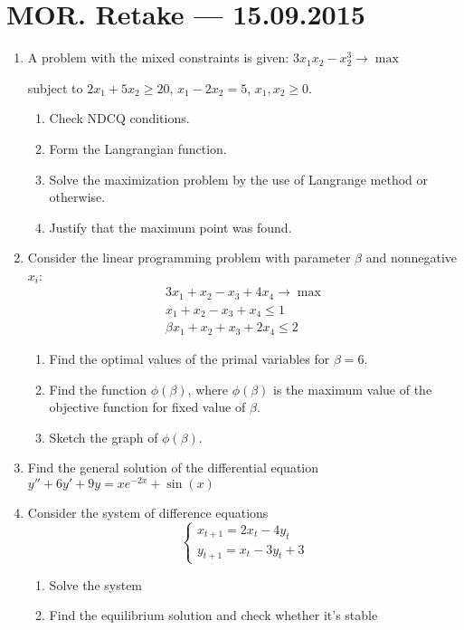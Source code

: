 \documentclass[12pt,a4paper]{article}
\begin{document}
\section*{MOR. Retake --- 15.09.2015}

\pagestyle{empty}

\begin{enumerate}
\item A problem with the mixed constraints is given: $3x_1 x_2-x_2^3 \to \max$

subject to $2x_1+5x_2 \geq 20$, $x_1-2x_2=5$, $x_1, x_2 \geq 0$.
\begin{enumerate}
\item Check NDCQ conditions.
\item  Form the Langrangian function.
\item Solve the maximization problem by the use of Langrange method or otherwise.
\item Justify that the maximum point was found.
\end{enumerate}

\item  Consider the linear programming problem with parameter $\beta$ and nonnegative $x_i$:
\begin{align*}
3x_1+x_2-x_3+4x_4 \to \max \\
x_1+x_2-x_3+x_4\leq 1 \\
\beta x_1+x_2+x_3+2x_4 \leq 2
\end{align*}

\begin{enumerate}
\item Find the optimal values of the primal variables for $\beta=6$.
\item Find the function $\phi(\beta)$, where $\phi(\beta)$  is the maximum value of the objective function for fixed value of $\beta$.
\item Sketch the graph of $\phi(\beta)$.
\end{enumerate}
\item Find the general solution of the differential equation $y''+6y'+9y=xe^{-2x}+\sin(x)$
\item Consider the system of difference equations
$$ 
\left\{ \begin{array}{l}
x_{t+1}=2x_t-4y_t \\
y_{t+1}=x_t-3y_t+3
\end{array} \right.
$$
\begin{enumerate}
\item Solve the system
\item Find the equilibrium solution and check whether it's stable
\end{enumerate}



\end{enumerate}
\end{document}
